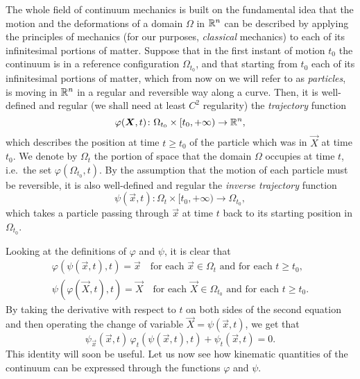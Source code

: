 The whole field of continuum mechanics is built on the fundamental idea that
the motion and the deformations of a domain $\Omega$ in $\mathbb{R}^n$
can be described by applying the principles of mechanics (for our purposes,
\emph{classical} mechanics) to each of its infinitesimal portions of matter.
Suppose that in the first instant of motion $t_0$ the continuum is
in a reference configuration $\Omega_{t_0}$, and that starting from
$t_0$ each of its infinitesimal portions of matter, which from
now on we will refer to as \emph{particles}, is moving in $\mathbb{R}^n$
in a regular and reversible way along a curve. Then, it is well-defined
and regular (we shall need at least $C^2$ regularity)
the \emph{trajectory} function
\[
\varphi(\bm{X},t) \colon \Omega_{t_0} \times [t_0,+\infty) \to \mathbb{R}^n,
\]
which describes the position at time $t \geq t_0$ of the particle which
was in $\vec{X}$ at time $t_0$. We denote by $\Omega_t$ the portion
of space that the domain $\Omega$ occupies at time $t$,
i.e.\ the set $\varphi(\Omega_{t_0},t)$.
By the assumption that the motion of each particle must be reversible,
it is also well-defined and regular the \emph{inverse trajectory} function
\[
\psi(\vec{x},t) \colon \Omega_t \times [t_0,+\infty) \to \Omega_{t_0},
\]
which takes a particle passing through $\vec{x}$ at time $t$ back
to its starting position in $\Omega_{t_0}$.

Looking at the definitions of $\varphi$ and $\psi$, it is clear that
\begin{gather*}
\varphi(\psi(\vec{x},t),t) = \vec{x}
\quad \text{for each $\vec{x} \in \Omega_t$ and for each $t \geq t_0$,} \\
\psi(\varphi(\vec{X},t),t) = \vec{X}
\quad \text{for each $\vec{X} \in \Omega_{t_0}$ and for each $t \geq t_0$.}
\end{gather*}
By taking the derivative with respect to $t$ on both sides
of the second equation and then operating the change of variable
$\vec{X} = \psi(\vec{x},t)$, we get that
\begin{equation} \label{eq:phi-psi-funzione-inversa}
\psi_{\vec{x}}(\vec{x},t) \, \varphi_t(\psi(\vec{x},t),t) + \psi_t(\vec{x},t) = 0.
\end{equation}
This identity will soon be useful. Let us now see how kinematic quantities
of the continuum can be expressed through the functions $\varphi$ and $\psi$.


